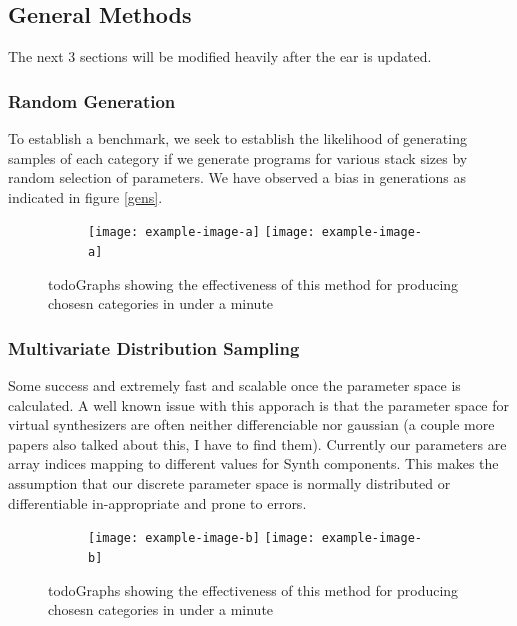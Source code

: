 \documentclass{nime-alternate} %
\begin{document}
\subsection{General Methods}
\colorbox{green!=30}{The next 3 sections will be modified heavily after the ear is updated.}
\subsubsection{Random Generation}
To establish a benchmark, we seek to establish the likelihood of generating samples of each category if we generate programs for various stack sizes by random selection of parameters. We have observed a bias in generations as indicated in figure \ref{gens}.\\
\begin{figure}[H]
\centering
\begin{subfigure}[b]{\linewidth}
\texttt{[image: example-image-a]}
\texttt{[image: example-image-a]}
\label{fig:1stack}
\setcounter{subfigure}{2}%
\end{subfigure}
\caption{\colorbox{green!=40}{todo}Graphs showing the effectiveness of this method for producing chosesn categories in under a minute}
\label{fig:rand-graphs}
\end{figure}
\subsubsection{Multivariate Distribution Sampling}
Some success and extremely fast and scalable once the parameter space is calculated. A well known issue with this apporach is that the parameter space for virtual synthesizers are often neither differenciable nor gaussian \cite{esling2019universal} (a couple more papers also talked about this, I have to find them). Currently our parameters are array indices mapping to different values for Synth components. This makes the assumption that our discrete parameter space is normally distributed or differentiable in-appropriate and prone to errors. \\
\begin{figure}[H]
\centering
\begin{subfigure}[b]{\linewidth}
\texttt{[image: example-image-b]}
\texttt{[image: example-image-b]}
\label{fig:1stack}
\setcounter{subfigure}{2}%
\end{subfigure}
\caption{\colorbox{green!=40}{todo}Graphs showing the effectiveness of this method for producing chosesn categories in under a minute}
\label{fig:multi-graphs}
\end{figure}
\end{document}
